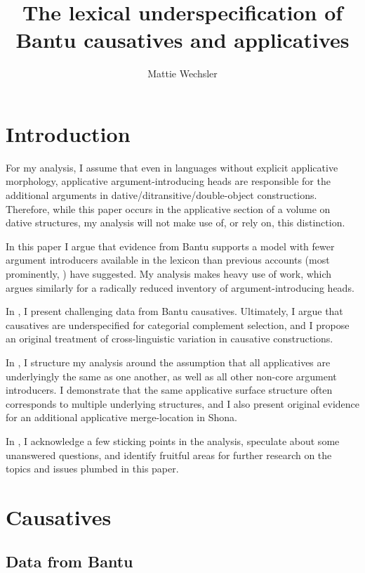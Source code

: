 \documentclass[output=paper,modfonts,nonflat,colorlinks,citecolor=brown]{langsci/langscibook}
\author{Mattie Wechsler\affiliation{}}
\title{The lexical underspecification of Bantu causatives and applicatives}
\begin{document}
\maketitle


\section{Introduction}\label{sec:wechsler:1}

For my analysis, I assume that even in languages without explicit applicative morphology, applicative argument-introducing heads are responsible for the additional arguments in dative/ditransitive/double-object constructions. Therefore, while this paper occurs in the applicative section of a volume on dative structures, my analysis will not make use of, or rely on, this distinction.

In this paper I argue that evidence from Bantu supports a model with fewer argument introducers available in the lexicon than previous accounts (most prominently, \citealt{Pylkkänen2008}) have suggested. My analysis makes heavy use of  work, which argues similarly for a radically reduced inventory of argument-introducing heads.

In , I present challenging data from Bantu causatives. Ultimately, I argue that causatives are underspecified for categorial complement selection, and I propose an original treatment of cross-linguistic variation in causative constructions.

In , I structure my analysis around the assumption that all applicatives are underlyingly the same as one another, as well as all other non-core argument introducers. I demonstrate that the same applicative surface structure often corresponds to multiple underlying structures, and I also present original evidence for an additional applicative merge-location in Shona.

In , I acknowledge a few sticking points in the analysis, speculate about some unanswered questions, and identify fruitful areas for further research on the topics and issues plumbed in this paper.

\section{Causatives}\label{sec:wechsler:2}

\subsection{Data from Bantu}\label{sec:wechsler:2.1}
\end{document}
